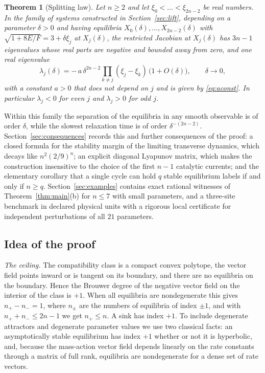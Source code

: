 \documentclass[11pt]{article}
\theoremstyle{plain}
\newtheorem{theorem}{Theorem}[section]
\theoremstyle{definition}
\theoremstyle{remark}
\numberwithin{equation}{section}
\begin{document}
\begin{theorem}[Splitting law]\label{thm:split}
Let \(n\ge2\) and let \(\xi_0<\dots<\xi_{2n-2}\) be real numbers. In the family of systems
constructed in Section~\ref{sec:lift}, depending on a parameter \(\delta>0\) and having
equilibria \(X_0(\delta),\dots,X_{2n-2}(\delta)\) with \(\sqrt{1+8E/F}=3+\delta\xi_j\) at
\(X_j(\delta)\), the restricted Jacobian at \(X_j(\delta)\) has \(3n-1\) eigenvalues whose real
parts are negative and bounded away from zero, and one real eigenvalue
\begin{equation}\label{eq:splitlaw}
 \lambda_j(\delta)=-\,a\,\delta^{2n-2}\prod_{k\ne j}(\xi_j-\xi_k)\,\bigl(1+O(\delta)\bigr),
 \qquad \delta\to0,
\end{equation}
with a constant \(a>0\) that does not depend on \(j\) and is given by \eqref{eq:aconst}. In
particular \(\lambda_j<0\) for even \(j\) and \(\lambda_j>0\) for odd \(j\).
\end{theorem}

Within this family the separation of the equilibria in any smooth observable is of order
\(\delta\), while the slowest relaxation time is of order \(\delta^{-(2n-2)}\). Section~\ref{sec:consequences}
records this and further consequences of the proof: a closed formula for the stability margin of
the limiting transverse dynamics, which decays like \(n^2(2/9)^{n}\); an explicit diagonal
Lyapunov matrix, which makes the construction insensitive to the choice of the first \(n-1\)
catalytic currents; and the elementary corollary that a single cycle can hold \(q\) stable
equilibrium labels if and only if \(n\ge q\). Section~\ref{sec:examples} contains exact
rational witnesses of Theorem~\ref{thm:main}(b) for \(n\le7\) with small parameters, and a
three-site benchmark in declared physical units with a rigorous local certificate for
independent perturbations of all \(21\) parameters.

\subsection{Idea of the proof}
\emph{The ceiling.} The compatibility class is a compact convex polytope, the vector field
points inward or is tangent on its boundary, and there are no equilibria on the boundary. Hence
the Brouwer degree of the negative vector field on the interior of the class is \(+1\). When all
equilibria are nondegenerate this gives \(n_+-n_-=1\), where \(n_\pm\) are the numbers of
equilibria of index \(\pm1\), and with \(n_++n_-\le2n-1\) we get \(n_+\le n\). A sink has index
\(+1\). To include degenerate attractors and degenerate parameter values we use two classical
facts: an asymptotically stable equilibrium has index \(+1\) whether or not it is hyperbolic,
and, because the mass-action vector field depends linearly on the rate constants through a
matrix of full rank, equilibria are nondegenerate for a dense set of rate vectors.
\end{document}
